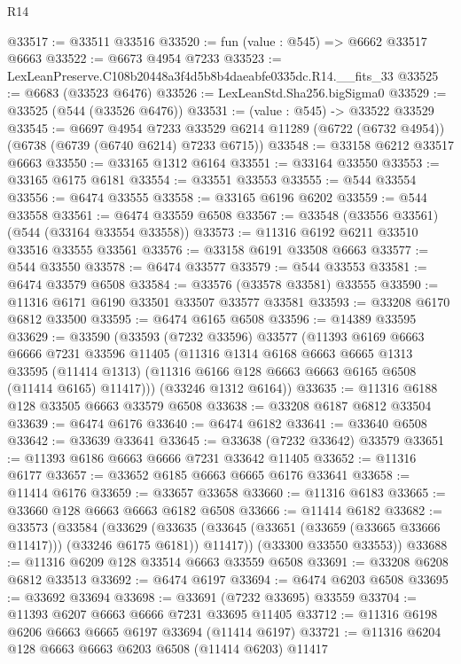 \begin{lexlean}{R14}
\begin{coremodule}
@33517 := @33511 @33516
@33520 := fun (value : @545) => @6662 @33517 @6663
@33522 := @6673 @4954 @7233
@33523 := LexLeanPreserve.C108b20448a3f4d5b8b4daeabfe0335dc.R14.__fits_33
@33525 := @6683 (@33523 @6476)
@33526 := LexLeanStd.Sha256.bigSigma0
@33529 := @33525 (@544 (@33526 @6476))
@33531 := (value : @545) -> @33522 @33529
@33545 := @6697
    @4954
    @7233
    @33529
    @6214
    @11289
    (@6722 (@6732 @4954))
    (@6738 (@6739 (@6740 @6214) @7233 @6715))
@33548 := @33158 @6212 @33517 @6663
@33550 := @33165 @1312 @6164
@33551 := @33164 @33550
@33553 := @33165 @6175 @6181
@33554 := @33551 @33553
@33555 := @544 @33554
@33556 := @6474 @33555
@33558 := @33165 @6196 @6202
@33559 := @544 @33558
@33561 := @6474 @33559 @6508
@33567 := @33548 (@33556 @33561) (@544 (@33164 @33554 @33558))
@33573 := @11316 @6192 @6211 @33510 @33516 @33555 @33561
@33576 := @33158 @6191 @33508 @6663
@33577 := @544 @33550
@33578 := @6474 @33577
@33579 := @544 @33553
@33581 := @6474 @33579 @6508
@33584 := @33576 (@33578 @33581) @33555
@33590 := @11316 @6171 @6190 @33501 @33507 @33577 @33581
@33593 := @33208 @6170 @6812 @33500
@33595 := @6474 @6165 @6508
@33596 := @14389 @33595
@33629 := @33590
    (@33593
      (@7232 @33596)
      @33577
      (@11393
        @6169
        @6663
        @6666
        @7231
        @33596
        @11405
        (@11316
          @1314
          @6168
          @6663
          @6665
          @1313
          @33595
          (@11414 @1313)
          (@11316 @6166 @128 @6663 @6663 @6165 @6508 (@11414 @6165) @11417)))
      (@33246 @1312 @6164))
@33635 := @11316 @6188 @128 @33505 @6663 @33579 @6508
@33638 := @33208 @6187 @6812 @33504
@33639 := @6474 @6176
@33640 := @6474 @6182
@33641 := @33640 @6508
@33642 := @33639 @33641
@33645 := @33638 (@7232 @33642) @33579
@33651 := @11393 @6186 @6663 @6666 @7231 @33642 @11405
@33652 := @11316 @6177
@33657 := @33652 @6185 @6663 @6665 @6176 @33641
@33658 := @11414 @6176
@33659 := @33657 @33658
@33660 := @11316 @6183
@33665 := @33660 @128 @6663 @6663 @6182 @6508
@33666 := @11414 @6182
@33682 := @33573
    (@33584
      (@33629
        (@33635 (@33645 (@33651 (@33659 (@33665 @33666 @11417))) (@33246 @6175 @6181)) @11417))
      (@33300 @33550 @33553))
@33688 := @11316 @6209 @128 @33514 @6663 @33559 @6508
@33691 := @33208 @6208 @6812 @33513
@33692 := @6474 @6197
@33694 := @6474 @6203 @6508
@33695 := @33692 @33694
@33698 := @33691 (@7232 @33695) @33559
@33704 := @11393 @6207 @6663 @6666 @7231 @33695 @11405
@33712 := @11316 @6198 @6206 @6663 @6665 @6197 @33694 (@11414 @6197)
@33721 := @11316 @6204 @128 @6663 @6663 @6203 @6508 (@11414 @6203) @11417

\end{coremodule}
\end{lexlean}
